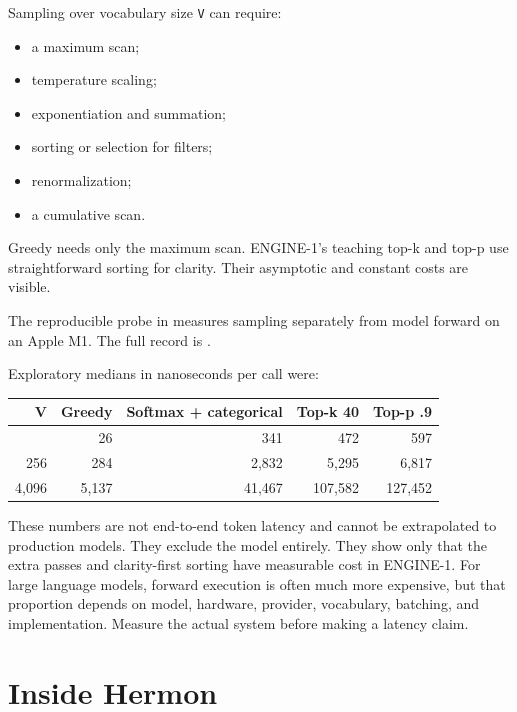 Sampling over vocabulary size \texttt{V} can require:

\begin{itemize}
\tightlist
\item
  a maximum scan;
\item
  temperature scaling;
\item
  exponentiation and summation;
\item
  sorting or selection for filters;
\item
  renormalization;
\item
  a cumulative scan.
\end{itemize}

Greedy needs only the maximum scan. ENGINE-1's teaching top-k and top-p
use straightforward sorting for clarity. Their asymptotic and constant
costs are visible.

The reproducible probe in
\texttt{}
measures sampling separately from model forward on an Apple M1. The full
record is
\href{https://github.com/hermonai/inside-the-llm-engine/blob/astra-visual-rewrite/research/benchmarks/chapter-04-sampling-cost.md}{\texttt{}}.

Exploratory medians in nanoseconds per call were:

{\def\LTcaptype{none} %
\begin{longtable}[]{@{}rrrrr@{}}
\toprule\noalign{}
V & Greedy & Softmax + categorical & Top-k 40 & Top-p .9 \\
\midrule\noalign{}
\endhead
\bottomrule\noalign{}
\endlastfoot
16 & 26 & 341 & 472 & 597 \\
256 & 284 & 2,832 & 5,295 & 6,817 \\
4,096 & 5,137 & 41,467 & 107,582 & 127,452 \\
\end{longtable}
}

These numbers are not end-to-end token latency and cannot be
extrapolated to production models. They exclude the model entirely. They
show only that the extra passes and clarity-first sorting have
measurable cost in ENGINE-1. For large language models, forward
execution is often much more expensive, but that proportion depends on
model, hardware, provider, vocabulary, batching, and implementation.
Measure the actual system before making a latency claim.

\section{Inside Hermon}\label{inside-hermon}


